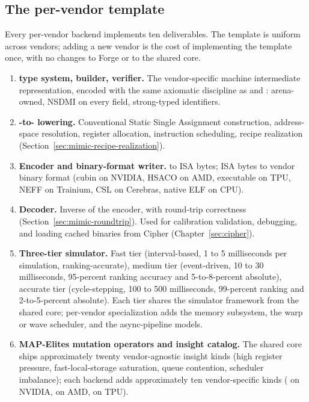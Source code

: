 \subsection{The per-vendor template}
\label{sec:mimic-template}

Every per-vendor backend implements ten deliverables.
The template is uniform across vendors; adding a new vendor is the cost of implementing the template once, with no changes to Forge or to the shared core.

\begin{enumerate}
  \item \textbf{ type system, builder, verifier.}
        The vendor-specific machine intermediate representation, encoded with the same axiomatic discipline as  and : arena-owned, NSDMI on every field, strong-typed identifiers.
  \item \textbf{-to- lowering.}
        Conventional Static Single Assignment construction, address-space resolution, register allocation, instruction scheduling, recipe realization (Section~\ref{sec:mimic-recipe-realization}).
  \item \textbf{Encoder and binary-format writer.}
         to ISA bytes; ISA bytes to vendor binary format (cubin on NVIDIA, HSACO on AMD, executable on TPU, NEFF on Trainium, CSL on Cerebras, native ELF on CPU).
  \item \textbf{Decoder.}
        Inverse of the encoder, with round-trip correctness (Section~\ref{sec:mimic-roundtrip}).
        Used for calibration validation, debugging, and loading cached binaries from Cipher (Chapter~\ref{sec:cipher}).
  \item \textbf{Three-tier simulator.}
        Fast tier (interval-based, 1 to 5 milliseconds per simulation, ranking-accurate), medium tier (event-driven, 10 to 30 milliseconds, 95-percent ranking accuracy and 5-to-8-percent absolute), accurate tier (cycle-stepping, 100 to 500 milliseconds, 99-percent ranking and 2-to-5-percent absolute).
        Each tier shares the simulator framework from the shared core; per-vendor specialization adds the memory subsystem, the warp or wave scheduler, and the async-pipeline models.
  \item \textbf{MAP-Elites mutation operators and insight catalog.}
        The shared core ships approximately twenty vendor-agnostic insight kinds (high register pressure, fast-local-storage saturation, queue contention, scheduler imbalance); each backend adds approximately ten vendor-specific kinds ( on NVIDIA,  on AMD,  on TPU).

\end{enumerate}
